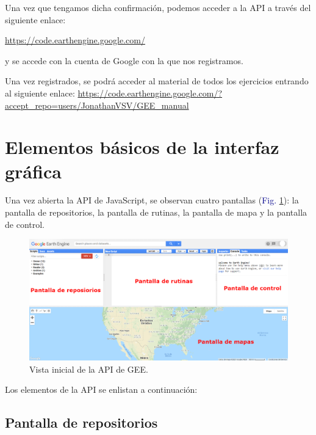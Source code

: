\documentclass[
  12pt,
  letterpaper,
  twoside]{book}
\begin{document}
Una vez que tengamos dicha confirmación, podemos acceder a la API a través del siguiente enlace:

\url{https://code.earthengine.google.com/}

y se accede con la cuenta de Google con la que nos registramos.

Una vez registrados, se podrá acceder al material de todos los ejercicios entrando al siguiente enlace: \url{https://code.earthengine.google.com/?accept_repo=users/JonathanVSV/GEE_manual}

\hypertarget{elementos-buxe1sicos-de-la-interfaz-gruxe1fica}{%
\section{Elementos básicos de la interfaz gráfica}\label{elementos-buxe1sicos-de-la-interfaz-gruxe1fica}}

Una vez abierta la API de JavaScript, se observan cuatro pantallas (\textcolor{darkblue}{Fig.} \ref{fig:f24}): la pantalla de repositorios, la pantalla de rutinas, la pantalla de mapa y la pantalla de control.

\begin{figure}[H]

{\centering \includegraphics[width=0.95\linewidth]{Img/GEE_inicio_API2} 

}

\caption{Vista inicial de la API de GEE.}\label{fig:f24}
\end{figure}

Los elementos de la API se enlistan a continuación:

\hypertarget{pantalla-de-repositorios}{%
\subsection*{Pantalla de repositorios}\label{pantalla-de-repositorios}}
\end{document}
